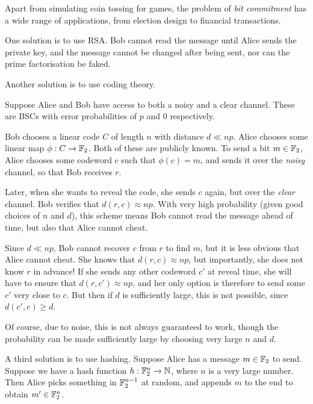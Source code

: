 \documentclass{article}
\begin{document}
\begin{note}
	Apart from simulating coin tossing for games, the problem of \textit{bit commitment} has a wide range of applications, from election design to financial transactions.
\end{note}

One solution is to use RSA. Bob cannot read the message until Alice sends the private key, and the message cannot be changed after being sent, nor can the prime factorisation be faked.

Another solution is to use coding theory.

\begin{remark}
    Suppose Alice and Bob have access to both a noisy and a clear channel. These are BSCs with error probabilities of $p$ and 0 respectively.
    
    Bob chooses a linear code $C$ of length $n$ with distance $d \ll np$. Alice chooses some linear map $\phi : C \to \mathbb{F}_2$. Both of these are publicly known. To send a bit $m \in \mathbb{F}_2$, Alice chooses some codeword $c$ such that $\phi(c) = m$, and sends it over the \textit{noisy} channel, so that Bob receives $r$.
    
    Later, when she wants to reveal the code, she sends $c$ again, but over the \textit{clear} channel. Bob verifies that $d(r, c) \approx np$. With very high probability (given good choices of $n$ and $d$), this scheme means Bob cannot read the message ahead of time, but also that Alice cannot cheat.
    
    Since $d \ll np$, Bob cannot recover $c$ from $r$ to find $m$, but it is less obvious that Alice cannot cheat. She knows that $d(r, c) \approx np$, but importantly, she does not know $r$ in advance! If she sends any other codeword $c'$ at reveal time, she will have to ensure that $d(r, c') \approx np$, and her only option is therefore to send some $c'$ very close to $c$. But then if $d$ is sufficiently large, this is not possible, since $d(c', c) \geq d$.
    
    Of course, due to noise, this is not always guaranteed to work, though the probability can be made sufficiently large by choosing very large $n$ and $d$.
\end{remark}

A third solution is to use hashing. Suppose Alice has a message $m \in \mathbb{F}_2$ to send. Suppose we have a hash function $h : \mathbb{F}_2^n \to \mathbb{N}$, where $n$ is a very large number. Then Alice picks something in $\mathbb{F}_2^{n-1}$ at random, and appends $m$ to the end to obtain $m' \in \mathbb{F}_2^n$.
\end{document}
